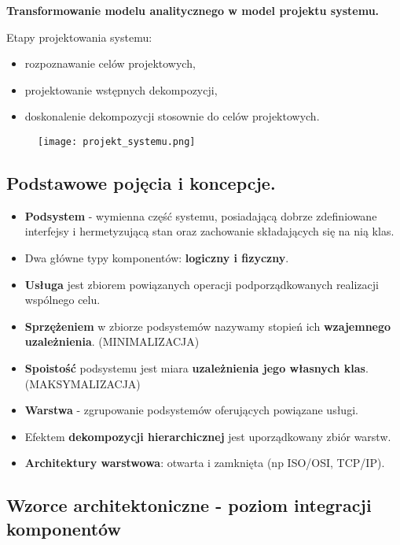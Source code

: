 \documentclass[../main.tex]{subfiles}
\begin{document}
    \textbf{Transformowanie modelu analitycznego w model projektu systemu.}

    Etapy projektowania systemu:
    \begin{itemize}
        \item rozpoznawanie celów projektowych,
        \item projektowanie wstępnych dekompozycji,
        \item doskonalenie dekompozycji stosownie do celów projektowych.
    \end{itemize}

    \begin{figure}[H]
        \texttt{[image: projekt\_systemu.png]}
    \end{figure}

    \subsection{Podstawowe pojęcia i koncepcje.}
    \begin{itemize}
        \item \textbf{Podsystem} - wymienna część systemu, posiadającą dobrze zdefiniowane interfejsy i
        hermetyzującą stan oraz zachowanie składających się na nią klas.
        \item Dwa główne typy komponentów: \textbf{logiczny i fizyczny}.
        \item \textbf{Usługa} jest zbiorem powiązanych operacji podporządkowanych realizacji wspólnego
        celu.
        \item \textbf{Sprzężeniem} w zbiorze podsystemów nazywamy stopień ich \textbf{wzajemnego uzależnienia}. (MINIMALIZACJA)
        \item \textbf{Spoistość} podsystemu jest miara \textbf{uzależnienia jego własnych klas}. (MAKSYMALIZACJA)
        \item \textbf{Warstwa} - zgrupowanie podsystemów oferujących powiązane usługi.
        \item Efektem \textbf{dekompozycji hierarchicznej} jest uporządkowany zbiór warstw.
        \item \textbf{Architektury warstwowa}: otwarta i zamknięta (np ISO/OSI, TCP/IP).
    \end{itemize}


    \subsection{Wzorce architektoniczne - poziom integracji komponentów}
\end{document}
